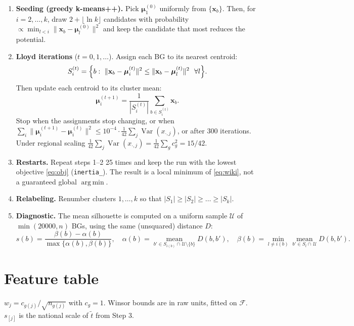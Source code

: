 \documentclass[11pt]{article}
\newcommand{\x}{\mathbf{x}}
\newcommand{\bmu}{\boldsymbol{\mu}}
\newcommand{\Var}{\operatorname{Var}}
\begin{document}
\begin{enumerate}
\item \textbf{Seeding (greedy k-means++).} Pick $\bmu_1^{(0)}$ uniformly from
  $\{\x_b\}$. Then, for $i=2,\dots,k$, draw $2+\lfloor\ln k\rfloor$ candidates with probability
  $\propto\min_{l<i}\|\x_b-\bmu^{(0)}_l\|^2$ and keep the candidate that most reduces the
  potential.
\item \textbf{Lloyd iterations} ($t=0,1,\dots$). Assign each BG to its nearest centroid:
  \[
  S_i^{(t)}=\Bigl\{b:\ \|\x_b-\bmu_i^{(t)}\|^2\le\|\x_b-\bmu_l^{(t)}\|^2\ \ \forall l\Bigr\}.
  \]
  Then update each centroid to its cluster mean:
  \[
  \bmu_i^{(t+1)}=\frac{1}{|S_i^{(t)}|}\sum_{b\in S_i^{(t)}}\x_b .
  \]
  Stop when the assignments stop changing, or when
  $\sum_i\|\bmu_i^{(t+1)}-\bmu_i^{(t)}\|^2\le10^{-4}\cdot\frac1{42}\sum_j\Var(x_{\cdot,j})$,
  or after 300 iterations. Under regional scaling
  $\frac1{42}\sum_j\Var(x_{\cdot,j})=\frac{1}{42}\sum_g c_g^2=15/42$.
\item \textbf{Restarts.} Repeat steps 1--2 25 times and keep the run with the lowest objective
  \eqref{eq:obj} (\texttt{inertia\_}). The result is a local minimum of
  \eqref{eq:wiki}, not a guaranteed global $\operatorname{arg\,min}$.
\item \textbf{Relabeling.} Renumber clusters $1,\dots,k$ so that
  $|S_1|\ge|S_2|\ge\dots\ge|S_k|$.
\item \textbf{Diagnostic.} The mean silhouette is computed on a uniform sample $\mathcal U$ of
  $\min(20000,n)$ BGs, using the same (unsquared) distance $D$:
  \[
  s(b)=\frac{\beta(b)-\alpha(b)}{\max\{\alpha(b),\beta(b)\}},\quad
  \alpha(b)=\operatorname*{mean}_{b'\in S_{i(b)}\cap\,\mathcal U\setminus\{b\}}D(b,b'),\quad
  \beta(b)=\min_{l\ne i(b)}\operatorname*{mean}_{b'\in S_l\cap\,\mathcal U}D(b,b').
  \]
\end{enumerate}

\section{Feature table}

$w_j=c_{g(j)}/\sqrt{n_{g(j)}}$ with $c_g=1$. Winsor bounds are in raw units, fitted on
$\mathcal F$. $s_{[j]}$ is the national scale of $\tilde t$ from Step 3.
\end{document}
